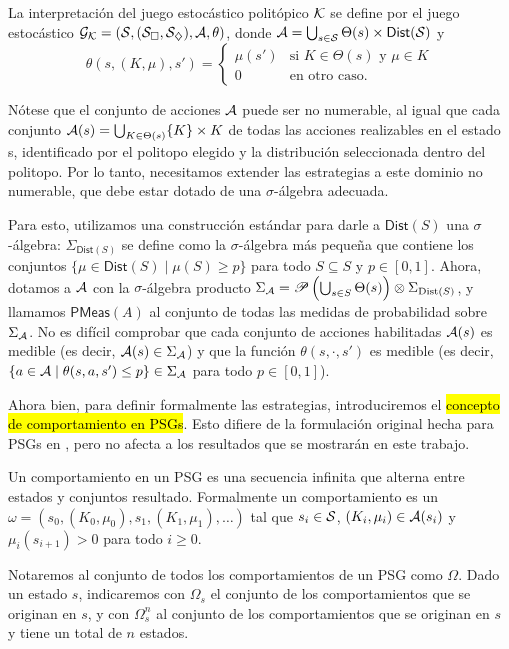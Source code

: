 \begin{definition}
	La interpretación del juego estocástico politópico \( \mathcal{K} \) se define por el juego estocástico \( \mathcal{G}_{\mathcal{K}} = (\mathcal{S}, (\mathcal{S}_\square, \mathcal{S}_\diamondsuit), \mathcal{A}, \theta) \), donde \( \mathcal{A} = \bigcup_{s \in \mathcal{S}} \Theta(s) \times \textsf{Dist}(\mathcal{S}) \) y
	\[
		\theta(s, (K, \mu), s') =
		\begin{cases}
			\mu(s') & \text{si } K \in \Theta(s) \text{ y } \mu \in K \\
			0 & \text{en otro caso}.
		\end{cases}
	\]
\end{definition}

Nótese que el conjunto de acciones \( \mathcal{A} \) puede ser no numerable, al igual
que cada conjunto \( \mathcal{A}(s) = \bigcup_{K \in \Theta(s)} \{K\} \times K \) de
todas las acciones realizables en el estado s, identificado por el politopo
elegido y la distribución seleccionada dentro del politopo. Por lo tanto,
necesitamos extender las estrategias a este dominio no numerable, que debe
estar dotado de una \( \sigma \)-álgebra adecuada.

Para esto, utilizamos una construcción estándar para darle a \(
\textsf{Dist}(S) \) una \( \sigma \)-álgebra: \( \Sigma_{\textsf{Dist}(S)} \)
se define como la \( \sigma \)-álgebra más pequeña que contiene los conjuntos
\( \{\mu \in \textsf{Dist}(S) \mid \mu(S) \geq p\} \) para todo \( S \subseteq
S \) y \( p \in [0, 1] \). Ahora, dotamos a \( \mathcal{A} \) con la \( \sigma
\)-álgebra producto \( \Sigma_{\mathcal{A}} = \mathscr{P} \left(\bigcup_{s \in S}
\Theta(s)\right) \otimes \Sigma_{\text{Dist}(S)} \), y llamamos \(
\textsf{PMeas}(A) \) al conjunto de todas las medidas de probabilidad sobre \(
\Sigma_{\mathcal{A}} \). No es difícil comprobar que cada conjunto de acciones
habilitadas \( \mathcal{A}(s) \) es medible (es decir, \( \mathcal{A}(s) \in \Sigma_{\mathcal{A}} \))
y que la función \( \theta(s, \cdot, s') \) es medible (es decir, \( \{a \in
\mathcal{A} \mid \theta(s, a, s') \leq p\} \in \Sigma_{\mathcal{A}} \) para todo \( p \in [0,
	1] \)).

Ahora bien, para definir formalmente las estrategias, introduciremos el
\hl{concepto de comportamiento en PSGs}. Esto difiere de la formulación
original hecha para PSGs en \cite{Polytopal}, pero no afecta a los resultados
que se mostrarán en este trabajo.

\begin{definition}
	Un comportamiento en un PSG es una secuencia infinita que alterna entre estados y conjuntos resultado. Formalmente un comportamiento es un $\omega = (s_0, (K_0, \mu_0), s_1, (K_1, \mu_1), \dots)$ tal que $s_i \in \mathcal{S}$, $(K_i, \mu_i) \in \mathcal{A}(s_i)$ y $\mu_i(s_{i+1}) > 0$ para todo $i \geq 0$.

	Notaremos al conjunto de todos los comportamientos de un PSG como $\Omega$.
	Dado un estado $s$, indicaremos con $\Omega_s$ el conjunto de los
	comportamientos que se originan en $s$, y con $\Omega_s^n$ al conjunto de los
	comportamientos que se originan en $s$ y tiene un total de $n$ estados.
\end{definition}

